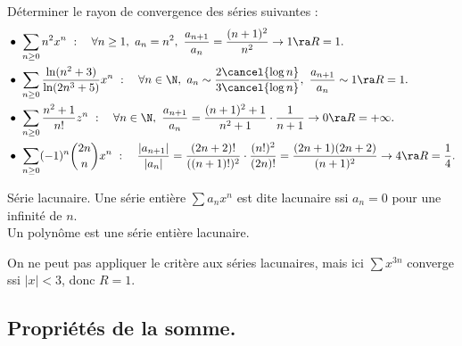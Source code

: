 \documentclass[11pt]{article}
\begin{document}
\vspace*{-0.8cm}

\begin{ex}{}{}
    Déterminer le rayon de convergence des séries suivantes :
    \begin{align*}
        &\bullet ~ \sum_{n\geq0} n^2x^n ~ : \quad \forall n \geq 1, ~ a_n = n^2, ~ \frac{a_{n+1}}{a_n}=\frac{(n+1)^2}{n^2}\to 1 \ra R=1.\\
        &\bullet ~ \sum_{n\geq0} \frac{\ln(n^2+3)}{\ln(2n^3+5)}x^n ~ : \quad \forall n \in \N, ~ a_n \sim \frac{2\cancel{\log n}}{3\cancel{\log n}}, ~ \frac{a_{n+1}}{a_n}\sim 1 \ra R=1.\\
        &\bullet ~ \sum_{n\geq0} \frac{n^2+1}{n!}z^n ~ : \quad \forall n \in \N, ~ \frac{a_{n+1}}{a_n}=\frac{(n+1)^2+1}{n^2+1}\cdot\frac{1}{n+1}\to 0 \ra R=+\infty.\\
        &\bullet ~ \sum_{n\geq0}(-1)^n\binom{2n}{n}x^n ~ : \quad \frac{|a_{n+1}|}{|a_n|}=\frac{(2n+2)!}{((n+1)!)^2}\cdot\frac{(n!)^2}{(2n)!}=\frac{(2n+1)(2n+2)}{(n+1)^2} \to 4 \ra R=\frac{1}{4}.
    \end{align*}
\end{ex}

\vspace*{-0.8cm}

\begin{defi}{Série lacunaire.}{}
    Une série entière $\sum a_nx^n$ est dite lacunaire ssi $a_n=0$ pour une infinité de $n$.\\
    Un polynôme est une série entière lacunaire.
\end{defi}

On ne peut pas appliquer le critère aux séries lacunaires, mais ici $\sum x^{3n}$ converge ssi $|x|<3$, donc $R=1$.

\pagebreak

\subsection{Propriétés de la somme.}
\end{document}

